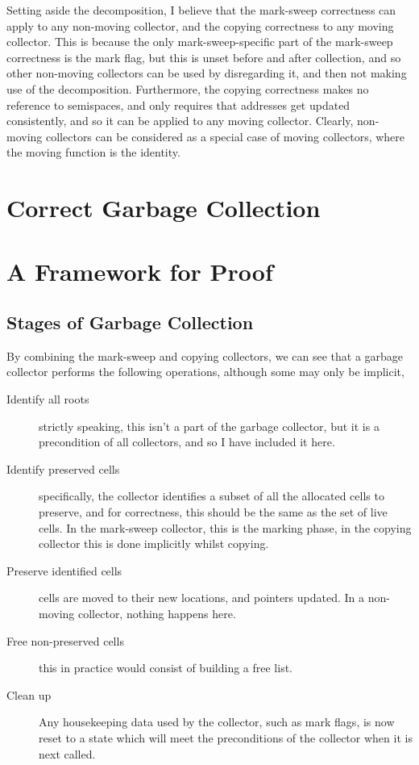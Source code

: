 Setting aside the decomposition, I believe that the mark-sweep
correctness can apply to any non-moving collector, and the copying
correctness to any moving collector. This is because the only
mark-sweep-specific part of the mark-sweep correctness is the mark
flag, but this is unset before and after collection, and so other
non-moving collectors can be used by disregarding it, and then not
making use of the decomposition. Furthermore, the copying correctness
makes no reference to semispaces, and only requires that addresses get
updated consistently, and so it can be applied to any moving
collector. Clearly, non-moving collectors can be considered as a
special case of moving collectors, where the moving function is the
identity.

\section{Correct Garbage Collection}
\label{sec:gc-correct}


\section{A Framework for Proof}
\label{sec:gc-framework}


\subsection{Stages of Garbage Collection}
\label{sec:gc-framework-stages}

By combining the mark-sweep and copying collectors, we can see that
a garbage collector performs the following operations, although some
may only be implicit,

\begin{description}
  \item[Identify all roots] strictly speaking, this isn't a part of
    the garbage collector, but it is a precondition of all collectors,
    and so I have included it here.

  \item[Identify preserved cells] specifically, the collector
    identifies a subset of all the allocated cells to preserve, and
    for correctness, this should be the same as the set of live
    cells. In the mark-sweep collector, this is the marking phase, in
    the copying collector this is done implicitly whilst copying.

  \item[Preserve identified cells] cells are moved to their new
    locations, and pointers updated. In a non-moving collector,
    nothing happens here.

  \item[Free non-preserved cells] this in practice would consist of
    building a free list.

  \item[Clean up] Any housekeeping data used by the collector, such as
    mark flags, is now reset to a state which will meet the
    preconditions of the collector when it is next called.
\end{description}

